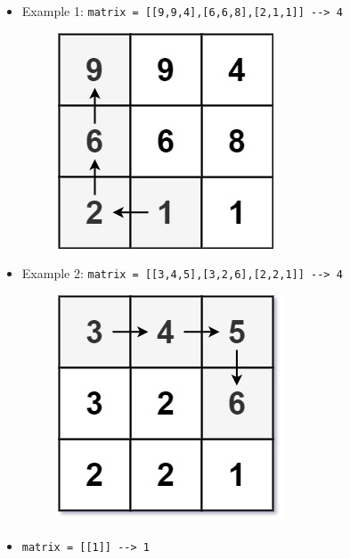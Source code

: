 \begin{itemize}
\item Example 1: {\colorbox{CodeBackground}{\lstinline|matrix = [[9,9,4],[6,6,8],[2,1,1]] --> 4|}}
\begin{figure}[H]
\centering
\includegraphics[width=0.15\linewidth]{images/lc0329_eg1}
\label{fig:lc0329eg1}
\end{figure}
\item Example 2: {\colorbox{CodeBackground}{\lstinline|matrix = [[3,4,5],[3,2,6],[2,2,1]] --> 4|}}
\begin{figure}[H]
\centering
\includegraphics[width=0.15\linewidth]{images/lc0329_eg2}
\label{fig:lc0329eg2}
\end{figure}
\item {\colorbox{CodeBackground}{\lstinline|matrix = [[1]] --> 1|}}
\end{itemize}

